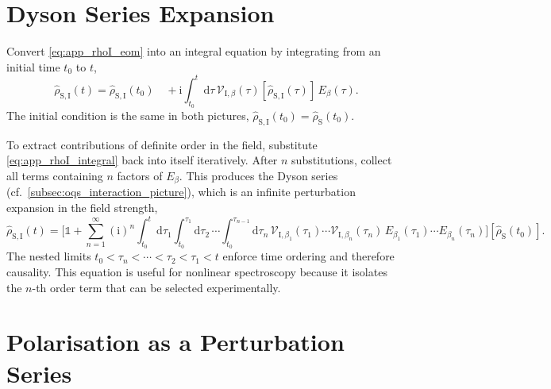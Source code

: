 \section{Dyson Series Expansion}
\label{app:sec:dyson_series}

Convert \autoref{eq:app_rhoI_eom} into an integral equation by integrating from an initial time $t_0$ to $t$,
\begin{equation}
	\hat{\rho}_{\mathrm{S,I}}(t)
	= \hat{\rho}_{\mathrm{S,I}}(t_0)
	\quad + \mathrm{i}\int_{t_0}^{t}\!\mathrm{d}\tau\,\mathcal{V}_{\mathrm I,\beta}(\tau)[\hat{\rho}_{\mathrm{S,I}}(\tau)]\,E_{\beta}(\tau).
	\label{eq:app_rhoI_integral}
\end{equation}
The initial condition is the same in both pictures,
$\hat{\rho}_{\mathrm{S,I}}(t_0)=\hat{\rho}_{\mathrm{S}}(t_0)$.

To extract contributions of definite order in the field, substitute \autoref{eq:app_rhoI_integral} back into itself iteratively. After $n$ substitutions, collect all terms containing $n$ factors of $E_{\beta}$. This produces the Dyson series (cf.~\autoref{subsec:oqs_interaction_picture}), which is an infinite perturbation expansion in the field strength,
\begin{equation}
	\hat{\rho}_{\mathrm{S,I}}(t)
	= \Biggl[
	\mathds{1}
	+ \sum_{n=1}^{\infty} (\mathrm{i})^n
	\int_{t_0}^{t}\!\mathrm{d}\tau_1
	\int_{t_0}^{\tau_1}\!\mathrm{d}\tau_2\,\cdots
	\int_{t_0}^{\tau_{n-1}}\!\mathrm{d}\tau_n\,
	\mathcal{V}_{\mathrm I,\beta_1}(\tau_1)\cdots\mathcal{V}_{\mathrm I,\beta_n}(\tau_n)\,
	E_{\beta_1}(\tau_1)\cdots E_{\beta_n}(\tau_n)
	\Biggr][\hat{\rho}_{\mathrm{S}}(t_0)].
	\label{eq:app_dyson}
\end{equation}
The nested limits $t_0<\tau_n<\cdots<\tau_2<\tau_1<t$ enforce time ordering and therefore causality.
This equation is useful for nonlinear spectroscopy because it isolates the $n$-th order term that can be selected experimentally.

\section{Polarisation as a Perturbation Series}
\label{app:sec:polarisation_series}

